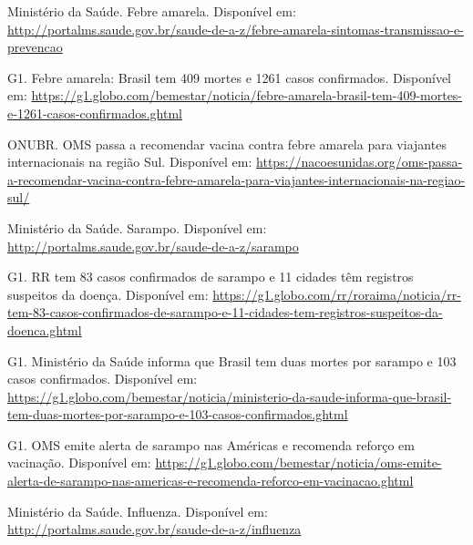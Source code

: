 \documentclass{article}
\begin{document}
\begin{enumerate}
{\calibrifont %


	\item Ministério da Saúde. Febre amarela. Disponível em: \url{http://portalms.saude.gov.br/saude-de-a-z/febre-amarela-sintomas-transmissao-e-prevencao}
    
	\item G1. Febre amarela: Brasil tem 409 mortes e 1261 casos confirmados. Disponível em: \url{https://g1.globo.com/bemestar/noticia/febre-amarela-brasil-tem-409-mortes-e-1261-casos-confirmados.ghtml}

	\item ONUBR. OMS passa a recomendar vacina contra febre amarela para viajantes internacionais na região Sul. Disponível em: \url{https://nacoesunidas.org/oms-passa-a-recomendar-vacina-contra-febre-amarela-para-viajantes-internacionais-na-regiao-sul/}

	\item Ministério da Saúde. Sarampo. Disponível em: \url{http://portalms.saude.gov.br/saude-de-a-z/sarampo}

	\item G1. RR tem 83 casos confirmados de sarampo e 11 cidades têm registros suspeitos da doença. Disponível em: \url{https://g1.globo.com/rr/roraima/noticia/rr-tem-83-casos-confirmados-de-sarampo-e-11-cidades-tem-registros-suspeitos-da-doenca.ghtml}
 
	\item G1. Ministério da Saúde informa que Brasil tem duas mortes por sarampo e 103 casos confirmados. Disponível em: \url{https://g1.globo.com/bemestar/noticia/ministerio-da-saude-informa-que-brasil-tem-duas-mortes-por-sarampo-e-103-casos-confirmados.ghtml}

	\item G1. OMS emite alerta de sarampo nas Américas e recomenda reforço em vacinação. Disponível em: \url{https://g1.globo.com/bemestar/noticia/oms-emite-alerta-de-sarampo-nas-americas-e-recomenda-reforco-em-vacinacao.ghtml}
    
	\item Ministério da Saúde. Influenza. Disponível em: \url{http://portalms.saude.gov.br/saude-de-a-z/influenza}
    
}
\end{enumerate}
\end{document}
